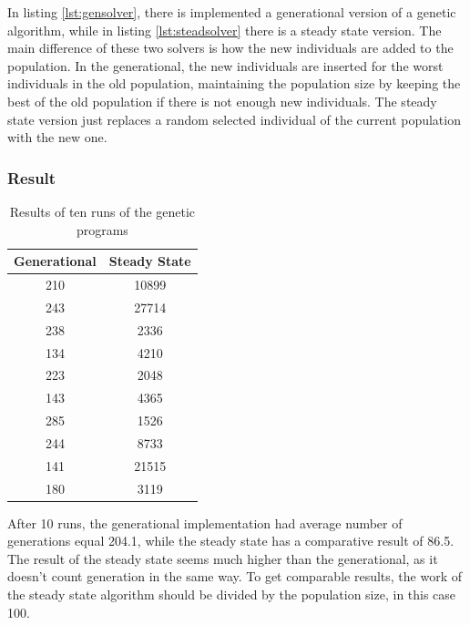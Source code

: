  

In listing \ref{lst:gensolver}, there is implemented a generational version of a genetic algorithm, while in listing \ref{lst:steadsolver} there is a steady state version.
The main difference of these two solvers is how the new individuals are added to the population.
In the generational, the new individuals are inserted for the worst individuals in the old population, maintaining the population size by keeping the best of the old population if there is not enough new individuals.
The steady state version just replaces a random selected individual of the current population with the new one.

\subsubsection{Result}
\begin{table}[H]
\begin{center}
\begin{tabular}{ | c | c | }
    \hline
    Generational    & Steady State \\
    \hline
    210             & 10899 \\
    243             & 27714 \\
    238             & 2336  \\
    134             & 4210  \\
    223             & 2048  \\
    143             & 4365  \\
    285             & 1526  \\
    244             & 8733  \\
    141             & 21515 \\
    180             & 3119  \\
    \hline
\end{tabular}
\end{center}
\caption{Results of ten runs of the genetic programs}
\label{tbl:genresults}
\end{table}
After 10 runs, the generational implementation had average number of generations equal 204.1, while the steady state has a comparative result of 86.5.
The result of the steady state seems much higher than the generational, as it doesn't count generation in the same way.
To get comparable results, the work of the steady state algorithm should be divided by the population size, in this case 100.

